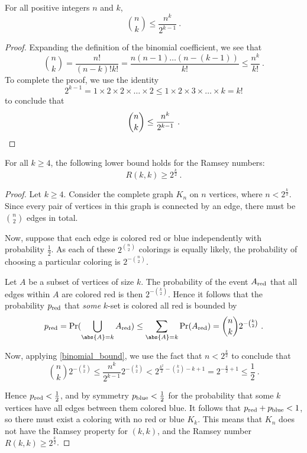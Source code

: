 \documentclass{article}
\begin{document}
\begin{Lemma} \label{binomial_bound}
    For all positive integers $n$ and $k$,
    \[ {n \choose k} \leq \frac{n^k}{2^{k-1}} \ . \]
\end{Lemma}

\begin{proof}
    Expanding the definition of the binomial coefficient, we see that
    \[
        {n \choose k}
        = \frac{n!}{(n-k)!k!}
        = \frac{n(n-1)\ldots(n-(k-1))}{k!}
        \leq \frac{n^k}{k!} \ .
    \]
    To complete the proof, we use the identity
    \[
        2^{k-1}
        = 1 \times 2 \times 2 \times \ldots \times 2
        \leq 1 \times 2 \times 3 \times \ldots \times k
        = k!
    \]
    to conclude that
    \[
        {n \choose k} \leq \frac{n^k}{2^{k-1}} \ . \qedhere
    \]
\end{proof}

\begin{Theorem}
    For all $k \geq 4$, the following lower bound holds for the Ramsey numbers:
    \[ R(k,k) \geq 2^{\frac k 2} \ . \]
\end{Theorem}

\begin{proof}
    Let $k \geq 4$. Consider the complete graph $K_n$ on $n$ vertices, where $n < 2^{\frac k 2}$. Since every pair of vertices in this graph is connected by an edge, there must be $n \choose 2$ edges in total.

    Now, suppose that each edge is colored red or blue independently with probability $\frac 1 2$. As each of these $2^{n \choose 2}$ colorings is equally likely, the probability of choosing a particular coloring is $2^{-{n \choose 2}}$.

    Let $A$ be a subset of vertices of size $k$. The probability of the event $A_{\mathrm{red}}$ that all edges within $A$ are colored red is then $2^{-{k \choose 2}}$. Hence it follows that the probability $p_{\mathrm{red}}$ that \emph{some} $k$-set is colored all red is bounded by
    \[
        p_\red = \Pr(\bigcup_{\abs{A} = k} A_\red)
        \leq \sum_{\abs{A} = k} \Pr(A_\red)
        = {n \choose k} 2^{-{k \choose 2}} \ .
    \]

Now, applying \cref{binomial_bound}, we use the fact that $n < 2^{\frac k 2}$ to conclude that
    \[
        {n \choose k} 2^{-{k \choose 2}}
        \leq \frac{n^k}{2^{k-1}} 2^{-{k \choose 2}}
        < 2^{\frac{k^2}{2} - {k \choose 2} - k + 1}
        = 2^{-\frac k 2 + 1}
        \leq \frac 1 2 \ .
    \]

Hence $p_{\mathrm{red}} < \frac 1 2$, and by symmetry $p_{\mathrm{blue}} < \frac 1 2$ for the probability that some $k$ vertices have all edges between them colored blue. It follows that $p_{\mathrm{red}} + p_{\mathrm{blue}} < 1$, so there must exist a coloring with no red or blue $K_k$. This means that $K_n$ does not have the Ramsey property for $(k, k)$, and the Ramsey number $R(k,k) \geq 2^{\frac k 2}$.
\end{proof}
\end{document}
